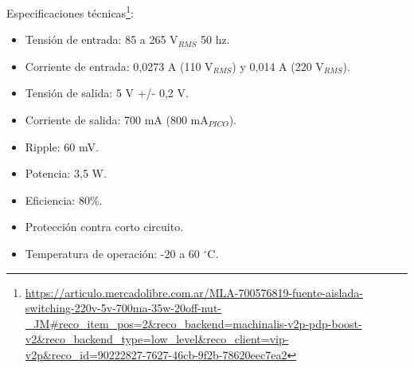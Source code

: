 Especificaciones técnicas\footnote{\url{https://articulo.mercadolibre.com.ar/MLA-700576819-fuente-aislada-switching-220v-5v-700ma-35w-20off-nut-_JM\#reco_item_pos=2&reco_backend=machinalis-v2p-pdp-boost-v2&reco_backend_type=low_level&reco_client=vip-v2p&reco_id=90222827-7627-46cb-9f2b-78620eec7ea2}}:
\begin{itemize}
\item Tensión de entrada: 85 a 265 V$_{RMS}$ 50 hz.
\item Corriente de entrada: 0,0273 A (110 V$_{RMS}$) y 0,014 A (220 V$_{RMS}$).
\item Tensión de salida: 5 V +/- 0,2 V.
\item Corriente de salida: 700 mA (800 mA$_{PICO}$).
\item Ripple: 60 mV.
\item Potencia: 3,5 W.
\item Eficiencia: 80\%.
\item Protección contra corto circuito.
\item Temperatura de operación: -20 a 60 $^{\circ}$C.
\end{itemize}



